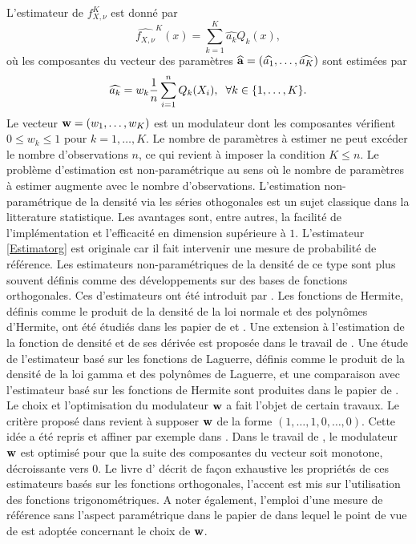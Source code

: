 L'estimateur de  $f_{X,\nu}^{K}$ est donné par 
\begin{equation}\label{Estimatorg}
\widehat{f_{X,\nu}}^{K}(x)=\sum_{k=1}^{K}\widehat{a_{k}}Q_{k}(x),
\end{equation}
où les composantes du vecteur des paramètres $\widehat{\bold{a}}=(\widehat{a_{1}},\ldots,\widehat{a_{K}})$ sont estimées par 
\begin{equation}\label{EstimatorCoefficient}
\widehat{a_{k}}=w_{k}\frac{1}{n}\sum_{i=1}^{n}Q_{k}(X_{i}), \hspace{0.2cm}\forall k\in\{1,\ldots,K\}.
\end{equation}
Le vecteur $\bold{w}=(w_{1},\ldots,w_{K})$ est un modulateur dont les composantes vérifient $0\leq w_{k}\leq1$ pour $k=1,\ldots,K$. Le nombre de paramètres à estimer ne peut excéder le nombre d\rq{}observations $n$, ce qui revient à imposer la condition $K\leq n$. Le problème d\rq{}estimation est non-paramétrique au sens où le nombre de paramètres à estimer augmente avec le nombre d\rq{}observations. L\rq{}estimation non-paramétrique de la densité via les séries othogonales est un sujet classique dans la litterature statistique. Les avantages sont, entre autres, la facilité de l'implémentation et l\rq{}efficacité en dimension supérieure à $1$. L\rq{}estimateur \eqref{Estimatorg} est originale car il fait intervenir une mesure de probabilité de référence. Les estimateurs non-paramétriques de la densité de ce type sont plus souvent définis comme des développements sur des bases de fonctions orthogonales. Ces d\rq{}estimateurs ont été introduit par \citet{Ce62}. Les fonctions de Hermite, définis comme le produit de la densité de la loi normale et des polynômes d\rq{}Hermite, ont été étudiés dans les papier de \citet{Sc67} et \citet{Wa77}. Une extension à l\rq{}estimation de la fonction de densité et de ses dérivée est proposée dans le travail de \citet{GrPa84}. Une étude de l'estimateur basé sur les fonctions de Laguerre, définis comme le produit de la densité de la loi gamma et des polynômes de Laguerre, et une comparaison avec l'estimateur basé sur les fonctions de Hermite sont produites dans le papier de \citet{Ha80}. Le choix et l\rq{}optimisation du modulateur $\bold{w}$ a fait l'objet de certain travaux. Le critère proposé dans \citet{KrTa68} revient à supposer $\bold{w}$ de la forme $(1,\ldots,1,0,\ldots,0)$. Cette idée a été repris et affiner par exemple dans \citet{DiHa86}. Dans le travail de \citet{Wa69}, le modulateur $\bold{w}$ est optimisé pour que la suite des composantes du vecteur soit monotone, décroissante vers $0$. Le livre d\rq{}\citet{Ef99} décrit de façon exhaustive les propriétés de ces estimateurs basés sur les fonctions orthogonales, l\rq{}accent est mis sur l\rq{}utilisation des fonctions trigonométriques. A noter également, l\rq{}emploi d\rq{}une mesure de référence sans l\rq{}aspect paramétrique dans le papier de \citet{AnFi80} dans lequel le point de vue de \citet{Wa69} est adoptée concernant le choix de $\bold{w}$.

